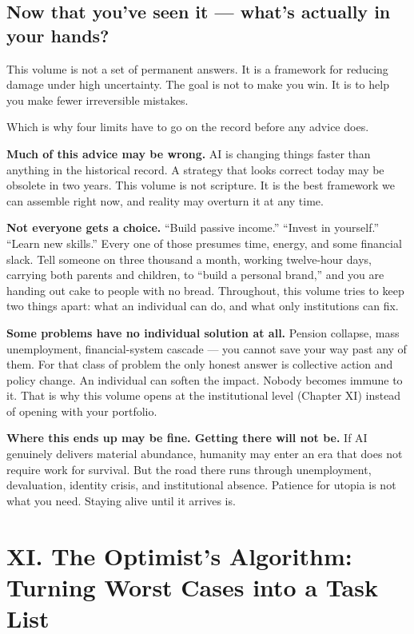\documentclass[11pt,a4paper]{article}
\begin{document}
\subsection{Now that you've seen it --- what's actually in your hands?}

This volume is not a set of permanent answers. It is a framework for reducing damage under high uncertainty. The goal is not to make you win. It is to help you make fewer irreversible mistakes.

Which is why four limits have to go on the record before any advice does.

\textbf{Much of this advice may be wrong.} AI is changing things faster than anything in the historical record. A strategy that looks correct today may be obsolete in two years. This volume is not scripture. It is the best framework we can assemble right now, and reality may overturn it at any time.

\textbf{Not everyone gets a choice.} ``Build passive income.'' ``Invest in yourself.'' ``Learn new skills.'' Every one of those presumes time, energy, and some financial slack. Tell someone on three thousand a month, working twelve-hour days, carrying both parents and children, to ``build a personal brand,'' and you are handing out cake to people with no bread. Throughout, this volume tries to keep two things apart: what an individual can do, and what only institutions can fix.

\textbf{Some problems have no individual solution at all.} Pension collapse, mass unemployment, financial-system cascade --- you cannot save your way past any of them. For that class of problem the only honest answer is collective action and policy change. An individual can soften the impact. Nobody becomes immune to it. That is why this volume opens at the institutional level (Chapter XI) instead of opening with your portfolio.

\textbf{Where this ends up may be fine. Getting there will not be.} If AI genuinely delivers material abundance, humanity may enter an era that does not require work for survival. But the road there runs through unemployment, devaluation, identity crisis, and institutional absence. Patience for utopia is not what you need. Staying alive until it arrives is.

\section{XI. The Optimist's Algorithm: Turning Worst Cases into a Task List}
\end{document}
